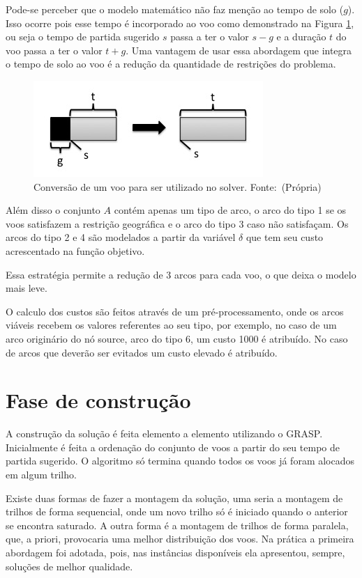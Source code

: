 \clearpage

Pode-se perceber que o modelo matemático não faz menção ao tempo de solo ($g$).
Isso ocorre pois esse tempo é incorporado ao voo como demonstrado na Figura
\ref{fig:conversion}, ou seja o tempo de partida sugerido $s$ passa a ter o
valor $s - g$ e a duração $t$ do voo passa a ter o valor $t + g$. Uma vantagem
de usar essa abordagem que integra o tempo de solo ao voo é a redução da
quantidade de restrições do problema.

\begin{figure}[ht]
	\centering
	\caption{Conversão de um voo para ser utilizado no
	solver. \mbox{Fonte: (Própria)}}\label{fig:conversion}
	\includegraphics[scale=0.4]{./img/conversion}
	
\end{figure}

Além disso o conjunto $A$ contém apenas um tipo de arco, o arco do tipo 1 se os
voos satisfazem a restrição geográfica e o arco do tipo 3 caso não satisfaçam.
Os arcos do tipo 2 e 4 são modelados a partir  da variável $\delta$ que tem seu
custo acrescentado na função objetivo.

Essa estratégia permite a redução de 3 arcos para cada voo, o que deixa o
modelo mais leve.

O calculo dos custos são feitos através de um pré-processamento, onde os arcos
viáveis recebem os valores referentes ao seu tipo, por exemplo, no caso de um
arco originário do nó source, arco do tipo 6, um custo 1000 é atribuído. No
caso de arcos que deverão ser evitados um custo elevado é atribuído.
  	
  
\section{Fase de construção}
  
A construção da solução é feita elemento a elemento utilizando o
GRASP. Inicialmente é feita a ordenação do conjunto de voos a partir do seu
tempo de partida sugerido. O algoritmo só termina quando todos os voos já
foram alocados em algum trilho.
  
Existe duas formas de fazer a montagem da solução, uma seria a montagem de
trilhos de forma sequencial, onde um novo trilho só é iniciado quando o anterior
se encontra saturado. A outra forma é a montagem de trilhos de forma paralela,
que, a priori, provocaria uma melhor distribuição dos voos. Na prática a
primeira abordagem foi adotada, pois, nas instâncias disponíveis ela apresentou,
sempre, soluções de melhor qualidade. 

